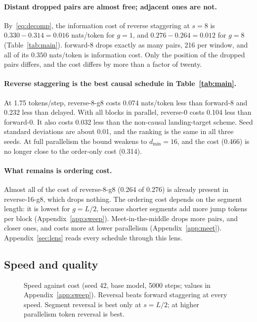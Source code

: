 \documentclass[11pt]{article}
\theoremstyle{definition}
\theoremstyle{remark}
\newcommand{\sch}[1]{\textsf{#1}}
\newcommand{\dmin}{d_{\min}}
\begin{document}
\paragraph{Distant dropped pairs are almost free; adjacent ones are not.}
By~\eqref{eq:decomp}, the information cost of reverse staggering at $s=8$ is $0.330-0.314=0.016$ nats/token for $g=1$, and $0.276-0.264=0.012$ for $g=8$ (Table~\ref{tab:main}).
\sch{forward-8} drops exactly as many pairs, 216 per window, and all of its $0.350$ nats/token is information cost.
Only the position of the dropped pairs differs, and the cost differs by more than a factor of twenty.

\paragraph{Reverse staggering is the best causal schedule in Table~\ref{tab:main}.}
At 1.75 tokens/step, \sch{reverse-8-g8} costs 0.074 nats/token less than \sch{forward-8} and 0.232 less than \sch{delayed}.
With all blocks in parallel, \sch{reverse-0} costs 0.104 less than \sch{forward-0}.
It also costs 0.032 less than the non-causal landing-target scheme.
Seed standard deviations are about 0.01, and the ranking is the same in all three seeds.
At full parallelism the bound weakens to $\dmin=16$, and the cost (0.466) is no longer close to the order-only cost (0.314).

\paragraph{What remains is ordering cost.}
Almost all of the cost of \sch{reverse-8-g8} (0.264 of 0.276) is already present in \sch{reverse-16-g8}, which drops nothing.
The ordering cost depends on the segment length: it is lowest for $g=L/2$, because shorter segments add more jump tokens per block (Appendix~\ref{app:sweep}).
Meet-in-the-middle drops more pairs, and closer ones, and costs more at lower parallelism (Appendix~\ref{app:meet}).
Appendix~\ref{sec:lens} reads every schedule through this lens.

\subsection{Speed and quality}
\label{sec:tradeoff}

\begin{figure}[t]
  \centering
  
  \caption{Speed against cost (seed 42, base model, 5000 steps; values in Appendix~\ref{app:sweep}). Reversal beats forward staggering at every speed. Segment reversal is best only at $s=L/2$; at higher parallelism token reversal is best.}
  \label{fig:tradeoff}
\end{figure}
\end{document}
